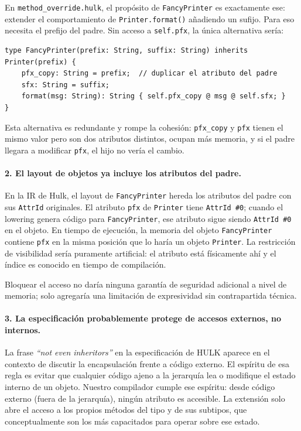 \documentclass[12pt,letterpaper]{article}
\newcommand{\hulk}{\textsc{HULK}}
\newcommand{\src}[1]{\texttt{#1}}
\begin{document}
En \src{method\_override.hulk}, el propósito de \src{FancyPrinter} es exactamente ese: extender el comportamiento de \src{Printer.format()} añadiendo un sufijo. Para eso necesita el prefijo del padre. Sin acceso a \src{self.pfx}, la única alternativa sería:

\begin{lstlisting}[language=HULK,caption={Alternativa sin acceso protegido: duplicacion innecesaria de estado}]
type FancyPrinter(prefix: String, suffix: String) inherits Printer(prefix) {
    pfx_copy: String = prefix;  // duplicar el atributo del padre
    sfx: String = suffix;
    format(msg: String): String { self.pfx_copy @ msg @ self.sfx; }
}
\end{lstlisting}

Esta alternativa es redundante y rompe la cohesión: \src{pfx\_copy} y \src{pfx} tienen el mismo valor pero son dos atributos distintos, ocupan más memoria, y si el padre llegara a modificar \src{pfx}, el hijo no vería el cambio.

\paragraph{2. El layout de objetos ya incluye los atributos del padre.}

En la IR de Hulk, el layout de \src{FancyPrinter} hereda los atributos del padre con sus \src{AttrId} originales. El atributo \src{pfx} de \src{Printer} tiene \src{AttrId \#0}; cuando el lowering genera código para \src{FancyPrinter}, ese atributo sigue siendo \src{AttrId \#0} en el objeto. En tiempo de ejecución, la memoria del objeto \src{FancyPrinter} contiene \src{pfx} en la misma posición que lo haría un objeto \src{Printer}. La restricción de visibilidad sería puramente artificial: el atributo está físicamente ahí y el índice es conocido en tiempo de compilación.

Bloquear el acceso no daría ninguna garantía de seguridad adicional a nivel de memoria; solo agregaría una limitación de expresividad sin contrapartida técnica.

\paragraph{3. La especificación probablemente protege de accesos externos, no internos.}

La frase \textit{``not even inheritors''} en la especificación de \hulk{} aparece en el contexto de discutir la encapsulación frente a código externo. El espíritu de esa regla es evitar que cualquier código ajeno a la jerarquía lea o modifique el estado interno de un objeto. Nuestro compilador cumple ese espíritu: desde código externo (fuera de la jerarquía), ningún atributo es accesible. La extensión solo abre el acceso a los propios métodos del tipo y de sus subtipos, que conceptualmente son los más capacitados para operar sobre ese estado.
\end{document}

